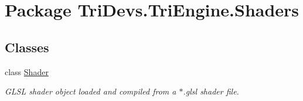 \hypertarget{namespace_tri_devs_1_1_tri_engine_1_1_shaders}{\section{Package Tri\-Devs.\-Tri\-Engine.\-Shaders}
\label{namespace_tri_devs_1_1_tri_engine_1_1_shaders}
}
\subsection*{Classes}
\begin{DoxyCompactItemize}
\item 
class \hyperlink{class_tri_devs_1_1_tri_engine_1_1_shaders_1_1_shader}{Shader}
\begin{DoxyCompactList}\small\item\em G\-L\-S\-L shader object loaded and compiled from a $\ast$.glsl shader file. \end{DoxyCompactList}\end{DoxyCompactItemize}
